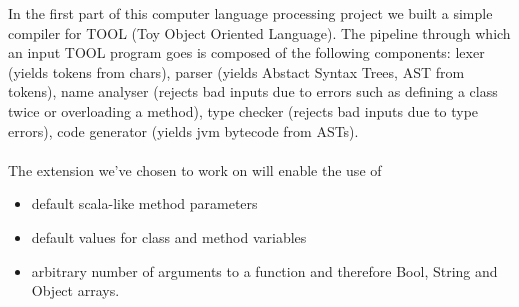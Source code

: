 In the first part of this computer language processing project we built a simple compiler for TOOL (Toy Object Oriented Language). The pipeline through which an input TOOL program goes is composed of the following components: lexer (yields tokens from chars), parser (yields Abstact Syntax Trees, AST from tokens), name analyser (rejects bad inputs due to errors such as defining a class twice or overloading a method), type checker (rejects bad inputs due to type errors), code generator (yields jvm bytecode from ASTs). \\ \\
The extension we've chosen to work on will enable the use of \begin{itemize}
\item default scala-like method parameters
\item default values for class and method variables
\item arbitrary number of arguments to a function and therefore Bool, String and Object arrays.
\end{itemize}

